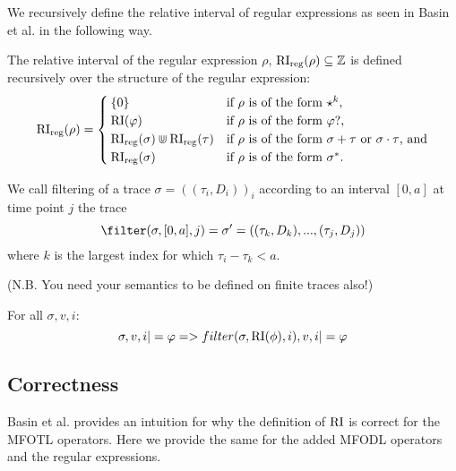We recursively define the relative interval of regular expressions as seen in Basin et al. \cite{Basin2020} in the following way.

\begin{definition}
    The relative interval of the regular expression $\rho$, $\operatorname{RI}_{\text{reg}}(\rho) \subseteq \mathbb{Z}$ is defined recursively over the structure of the regular expression:
    \begin{equation*}
        \operatorname{RI}_{\text{reg}}(\rho) =
        \begin{cases}
            \{0\} & \text{if $\rho$ is of the form $\star^k$,} \\
            \operatorname{RI}(\varphi) & \text{if $\rho$ is of the form $\varphi?$,} \\
            \operatorname{RI}_{\text{reg}}(\sigma) \Cup \operatorname{RI}_{\text{reg}}(\tau) & \text{if $\rho$ is of the form $\sigma + \tau$ or $\sigma \cdot \tau$, and} \\
            \operatorname{RI}_{\text{reg}}(\sigma) & \text{if $\rho$ is of the form $\sigma^*$.}

        \end{cases}
    \end{equation*}
\end{definition}

\begin{definition}
    We call filtering of a trace $\sigma=((\tau_i,D_i))_i$ according to an interval $[0,a]$ at time point $j$ the trace 
    \begin{equation*}
        \filter(\sigma, [0,a], j) = \sigma' = ((\tau_k,D_k), ..., (\tau_j,D_j))
    \end{equation*}
    where $k$ is the largest index for which $\tau_i - \tau_k < a$.
\end{definition}
(N.B. You need your semantics to be defined on finite traces also!)

\begin{theorem}
    For all  $\sigma, v, i$:
    \begin{equation*}
        \sigma, v, i |= \varphi => filter(\sigma, \operatorname{RI}(\phi), i), v, i |= \varphi
    \end{equation*}
\end{theorem}

\subsection{Correctness}
Basin et al. \cite{Basin2016} provides an intuition for why the definition of $\operatorname{RI}$ is correct for the MFOTL operators.
Here we provide the same for the added MFODL \cite{Basin2020} operators and the regular expressions.

